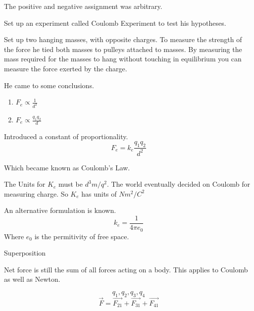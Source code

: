 \documentclass{report}
\begin{document}
\begin{description}
\begin{mdframed}
            The positive and negative assignment was arbitrary.

            Set up an experiment called Coulomb Experiment
            to test his hypotheses.

            Set up two hanging masses, with opposite charges.
            To measure the strength of the force he tied
            both masses to pulleys attached to masses.
            By measuring the mass required for the masses
            to hang without touching in equilibrium you
            can measure the force exerted by the charge.

            He came to some conclusions.
            \begin{enumerate}
                \item $F_e \propto \frac{1}{d^2}$
                \item $F_e \propto \frac{q_1 q_2}{d}$
            \end{enumerate}

            Introduced a constant of proportionality.
            \begin{displaymath}
                F_e = k_e \frac{q_1 q_2}{d^2}
            \end{displaymath}
            
            Which became known as Coulomb's Law.

            The Units for $K_e$ must be  $d^3 m/q^2$.
            The world eventually decided on Coulomb for
            measuring charge. So  $K_e$ has units of
            $\si{Nm^2/C^2}$

            An alternative formulation is known.
            \begin{displaymath}
                k_e = \frac{1}{4\pi e_0}
            \end{displaymath}
            Where $e_0$ is the permitivity of free space.
            
        \end{mdframed}
        \pagebreak
    \item {\large Superposition}
        \begin{mdframed}
            Net force is still the sum of all forces acting
            on a body. This applies to Coulomb as well as
            Newton.

            \begin{displaymath}
                q_1, q_2, q_3, q_4
            \end{displaymath}
            \begin{displaymath}
                \vec{F} = \vec{F_{21}} + \vec{F_{31}}
                + \vec{F_{41}}
            \end{displaymath}
            
        \end{mdframed}

\end{description}
\end{document}
